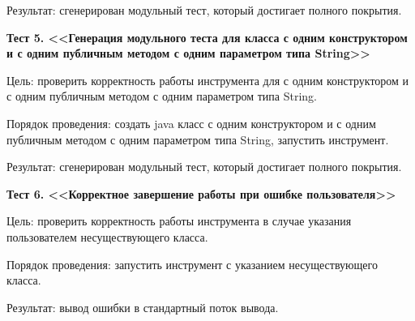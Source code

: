 Результат: сгенерирован модульный тест, который достигает полного покрытия.


\textbf{Тест 5. <<Генерация модульного теста для класса с одним конструктором и с одним публичным методом с одним параметром типа String>>}

Цель: проверить корректность работы инструмента для с одним конструктором и с одним публичным методом с одним параметром типа String.

Порядок проведения: создать java класс с одним конструктором и с одним публичным методом с одним параметром типа String, запустить инструмент.

Результат: сгенерирован модульный тест, который достигает полного покрытия.


\textbf{Тест 6. <<Корректное завершение работы при ошибке пользователя>>}

Цель: проверить корректность работы инструмента в случае указания пользователем несуществующего класса.

Порядок проведения: запустить инструмент с указанием несуществующего класса.

Результат: вывод ошибки в стандартный поток вывода.